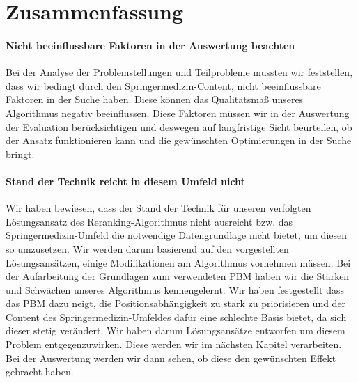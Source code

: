 \section{Zusammenfassung}
\label{sec:Grundlagen:Zusammenfassung}

\paragraph{Nicht beeinflussbare Faktoren in der Auswertung beachten}
Bei der Analyse der Problemstellungen und Teilprobleme mussten wir feststellen, dass wir bedingt durch den Springermedizin-Content, nicht beeinflussbare Faktoren in der Suche haben. Diese können das Qualitätsmaß unseres Algorithmus negativ beeinflussen. Diese Faktoren müssen wir in der Auswertung der Evaluation berücksichtigen und deswegen auf langfristige Sicht beurteilen, ob der Ansatz funktionieren kann und die gewünschten Optimierungen in der Suche bringt. 

\paragraph{Stand der Technik reicht in diesem Umfeld nicht}
Wir haben bewiesen, dass der Stand der Technik für unseren verfolgten Lösungsansatz des Reranking-Algorithmus nicht ausreicht bzw. das Springermedizin-Umfeld die notwendige Datengrundlage nicht bietet, um diesen so umzusetzen. Wir werden darum basierend auf den vorgestellten Lösungsansätzen, einige Modifikationen am Algorithmus vornehmen müssen. Bei der Aufarbeitung der Grundlagen zum verwendeten PBM haben wir die Stärken und Schwächen unseres Algorithmus kennengelernt. Wir haben festgestellt dass das PBM dazu neigt, die Positionsabhängigkeit zu stark zu priorisieren und der Content des Springermedizin-Umfeldes dafür eine schlechte Basis bietet, da sich dieser stetig verändert. Wir haben darum Lösungsansätze entworfen um diesem Problem entgegenzuwirken. Diese werden wir im nächsten Kapitel verarbeiten. Bei der Auswertung werden wir dann sehen, ob diese den gewünschten Effekt gebracht haben. 
